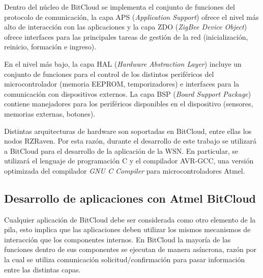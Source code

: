 Dentro del núcleo de BitCloud se implementa el conjunto de funciones del protocolo de comunicación, la capa APS (\textit{Application Support}) ofrece el nivel más alto de interacción con las aplicaciones y la capa ZDO (\textit{ZigBee Device Object}) ofrece interfaces para las principales tareas de gestión de la red (inicialización, reinicio, formación e ingreso). 

En el nivel más bajo, la capa HAL (\textit{Hardware Abstraction Layer}) incluye un conjunto de funciones para el control de los distintos periféricos del microcontrolador (memoria EEPROM, temporizadores) e interfaces para la comunicación con dispositivos externos. La capa BSP (\textit{Board Support Package}) contiene manejadores para los periféricos disponibles en el dispositivo (sensores, memorias externas, botones). 

Distintas arquitecturas de hardware son soportadas en BitCloud, entre ellas los nodos RZRaven. Por esta razón, durante el desarrollo de este trabajo se utilizará a BitCloud para el desarrollo de la aplicación de la WSN. En particular, se utilizará el lenguaje de programación C y el compilador AVR-GCC, una versión optimizada del compilador \textit{GNU C Compiler} para microcontroladores Atmel.



\subsection{Desarrollo de aplicaciones con Atmel BitCloud}

Cualquier aplicación de BitCloud debe ser considerada como otro elemento de la pila, esto implica que las aplicaciones deben utilizar los mismos mecanismos de interacción que los componentes internos. En BitCloud la mayoría de las funciones dentro de sus componentes se ejecutan de manera asíncrona, razón por la cual se utiliza comunicación solicitud/confirmación para pasar información entre las distintas capas. 

